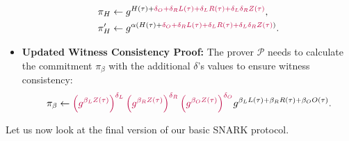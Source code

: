 \documentclass[../lecture-notes-148x210.tex]{subfiles}
\begin{document}
\begin{proposition}
\begin{itemize}
\begin{equation*}
\begin{aligned}
                &\pi_H \gets g^{H(\tau) + \textcolor{purple}{\delta_O + \delta_R L(\tau) + \delta_L R(\tau) + \delta_L \delta_R Z(\tau)}}, \\ 
                &\pi_H' \gets g^{\alpha(H(\tau) + \textcolor{purple}{\delta_O + \delta_R L(\tau) + \delta_L R(\tau) + \delta_L \delta_R Z(\tau)})}.                
            \end{aligned}
        \end{equation*}
        \item \textbf{Updated Witness Consistency Proof:} The prover $\mathcal{P}$ needs to calculate the commitment $\pi_{\beta}$ with the additional $\delta$'s values to ensure witness consistency:
        \begin{equation*}
            \pi_{\beta} \gets \textcolor{purple}{\left(g^{\beta_L Z(\tau)}\right)^{\delta_L}\left(g^{\beta_R Z(\tau)}\right)^{\delta_R}\left(g^{\beta_O Z(\tau)}\right)^{\delta_O}}g^{\beta_LL(\tau) + \beta_RR(\tau) + \beta_OO(\tau)}.
        \end{equation*}
    \end{itemize}
\end{proposition}

Let us now look at the final version of our basic SNARK protocol.
\end{document}

